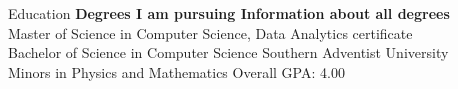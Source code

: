 \begin{rSection}{Education}
  {\bf\small Degrees I am pursuing \hfill \bf Information about all degrees}\\
	Master of Science in Computer Science, Data Analytics certificate \hfill {}\\
	Bachelor of Science in Computer Science \hfill {Southern Adventist University}\\
	Minors in Physics and Mathematics \hfill {Overall GPA: 4.00}
\end{rSection}